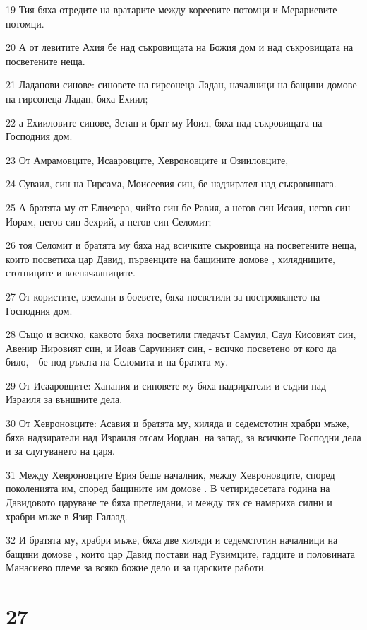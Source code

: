 \par 19 Тия бяха отредите на вратарите между кореевите потомци и Мерариевите потомци.
\par 20 А от левитите Ахия бе над съкровищата на Божия дом и над съкровищата на посветените неща.
\par 21 Ладанови синове: синовете на гирсонеца Ладан, началници на бащини домове на гирсонеца Ладан, бяха Ехиил;
\par 22 а Ехииловите синове, Зетан и брат му Иоил, бяха над съкровищата на Господния дом.
\par 23 От Амрамовците, Исааровците, Хевроновците и Озииловците,
\par 24 Суваил, син на Гирсама, Моисеевия син, бе надзирател над съкровищата.
\par 25 А братята му от Елиезера, чийто син бе Равия, а негов син Исаия, негов син Иорам, негов син Зехрий, а негов син Селомит; -
\par 26 тоя Селомит и братята му бяха над всичките съкровища на посветените неща, които посветиха цар Давид, първенците на бащините домове , хилядниците, стотниците и военачалниците.
\par 27 От користите, вземани в боевете, бяха посветили за построяването на Господния дом.
\par 28 Също и всичко, каквото бяха посветили гледачът Самуил, Саул Кисовият син, Авенир Нировият син, и Иоав Саруиният син, - всичко посветено от кого да било, - бе под ръката на Селомита и на братята му.
\par 29 От Исааровците: Ханания и синовете му бяха надзиратели и съдии над Израиля за външните дела.
\par 30 От Хевроновците: Асавия и братята му, хиляда и седемстотин храбри мъже, бяха надзиратели над Израиля отсам Иордан, на запад, за всичките Господни дела и за слугуването на царя.
\par 31 Между Хевроновците Ерия беше началник, между Хевроновците, според поколенията им, според бащините им домове . В четиридесетата година на Давидовото царуване те бяха прегледани, и между тях се намериха силни и храбри мъже в Язир Галаад.
\par 32 И братята му, храбри мъже, бяха две хиляди и седемстотин началници на бащини домове , които цар Давид постави над Рувимците, гадците и половината Манасиево племе за всяко божие дело и за царските работи.

\chapter{27}

